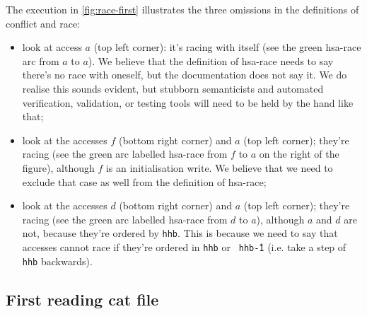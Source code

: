 \documentclass[a4paper]{article}
\begin{document}
{\color{blue} The execution in \myfig\ref{fig:race-first} illustrates the three
omissions in the definitions of conflict and race:

\begin{itemize}
\item look at access $a$ (top left corner): it's racing with itself (see the
green hsa-race arc from $a$ to $a$). We believe that the definition of hsa-race
needs to say there's no race with oneself, but the documentation does not say
it. We do realise this sounds evident, but stubborn semanticists and automated
verification, validation, or testing tools will need to be held by the hand
like that; 
\item look at the accesses $f$ (bottom right corner) and $a$ (top left corner);
they're racing (see the green arc labelled hsa-race from $f$ to $a$ on the
right of the figure), although $f$ is an initialisation write. We believe that
we need to exclude that case as well from the definition of hsa-race;
\item look at the accesses $d$ (bottom right corner) and $a$ (top left corner);
they're racing (see the green arc labelled hsa-race from $d$ to $a$), although
$a$ and $d$ are not, because they're ordered by {\tt hhb}. This is because we
need to say that accesses cannot race if they're ordered in {\tt hhb} or {\tt
hhb\^-1} (i.e. take a step of {\tt hhb} backwards).
\end{itemize}
}

\clearpage

\subsection{First reading cat file}
\end{document}
